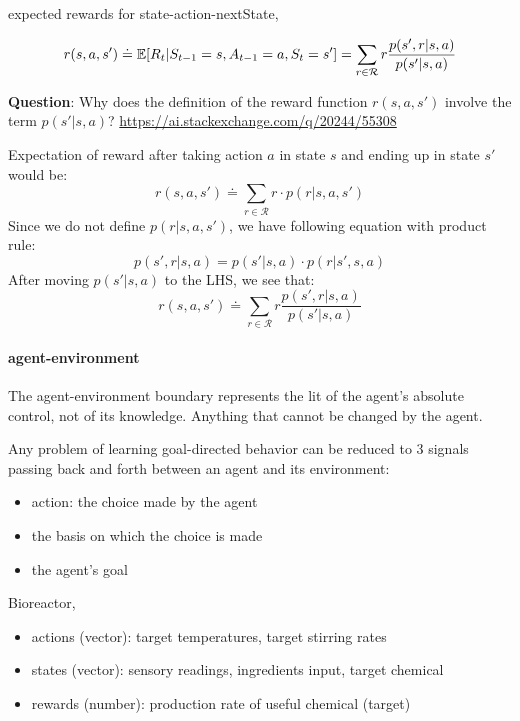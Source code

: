 \documentclass[sutton_barto_notes.tex]{subfiles}
\begin{document}
\begin{definition}
expected rewards for state-action-nextState,

$$ r(s,a,s') \doteq \operatorname*{\mathbb{E}} [R_t | S_{t-1}=s, A_{t-1}=a, S_t=s'] = \sum_{r \in \mathcal{R}} r \frac{p(s',r|s,a)}{p(s'|s,a)} $$
\end{definition}

\textbf{Question}: Why does the definition of the reward function $r(s,a,s')$ involve the term $p(s'|s,a)$? \url{https://ai.stackexchange.com/q/20244/55308}

Expectation of reward after taking action $a$ in state $s$ and ending up in state $s'$ would be:
$$ r(s,a,s') \doteq \sum_{r\in \mathcal{R}} r \cdot p(r|s,a,s') $$
Since we do not define $p(r|s,a,s')$, we have following equation with product rule:
$$ p(s',r|s,a) = p(s'|s,a) \cdot p(r|s',s,a) $$
After moving $p(s'|s,a)$ to the LHS, we see that:
$$ r(s,a,s') \doteq \sum_{r \in \mathcal{R}} r \frac{p(s',r|s,a)}{p(s'|s,a)} $$



\paragraph{agent-environment}
The agent-environment boundary represents the lit of the agent's absolute control, not of its knowledge. Anything that cannot be changed by the agent.

Any problem of learning goal-directed behavior can be reduced to 3 signals passing back and forth between an agent and its environment:
\begin{itemize}
\item action: the choice made by the agent
\item the basis on which the choice is made
\item the agent's goal
\end{itemize}

\begin{example}
Bioreactor,

\begin{itemize}
\item actions (vector): target temperatures, target stirring rates
\item states (vector): sensory readings, ingredients input, target chemical
\item rewards (number): production rate of useful chemical (target)
\end{itemize}

\end{example}
\end{document}

